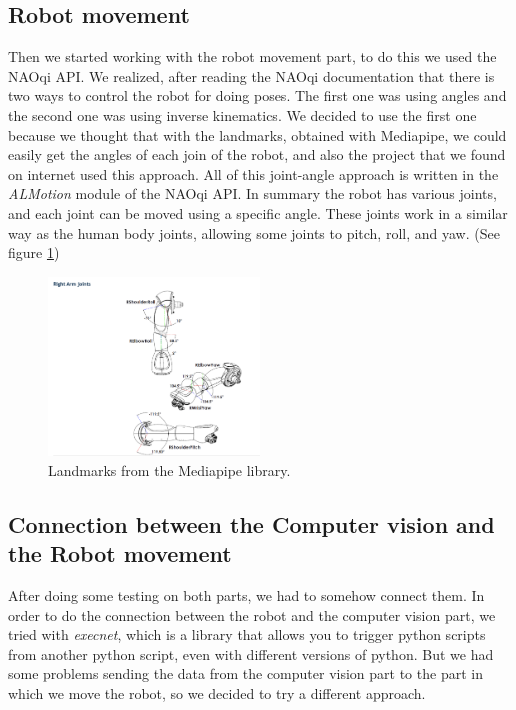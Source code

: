 \documentclass[conference]{IEEEtran}
\begin{document}
\subsection{Robot movement}

Then we started working with the robot movement part, to do this we used the NAOqi API. We realized, after reading the NAOqi documentation that there is two ways to control the robot for doing poses. The first one was using angles and the second one was using inverse kinematics. 
We decided to use the first one because we thought that with the landmarks, obtained with Mediapipe, we could easily get the angles of each join of the robot, and also the project that we found on internet used this approach.
All of this joint-angle approach is written in the \textit{ALMotion} module of the NAOqi API. 
In summary the robot has various joints, and each joint can be moved using a specific angle. These joints work in a similar way as the human body joints, allowing some joints to pitch, roll, and yaw. (See figure \ref{fig:RightArmAngles})

\begin{figure}[htbp]
    \centerline{\includegraphics[width=0.5\textwidth]{images/RightArmAngles.jpeg}}
    \caption{Landmarks from the Mediapipe library.}
    \label{fig:RightArmAngles}
    \end{figure}

\subsection{Connection between the Computer vision and the Robot movement}
After doing some testing on both parts, we had to somehow connect them. In order to do the connection between the robot and the computer vision part, we tried with \textit{execnet}, which is a library that allows you to trigger python scripts from another python script, even with different versions of python. But we had some problems sending the data from the computer vision part to the part in which we move the robot, so we decided to try a different approach.
\end{document}
